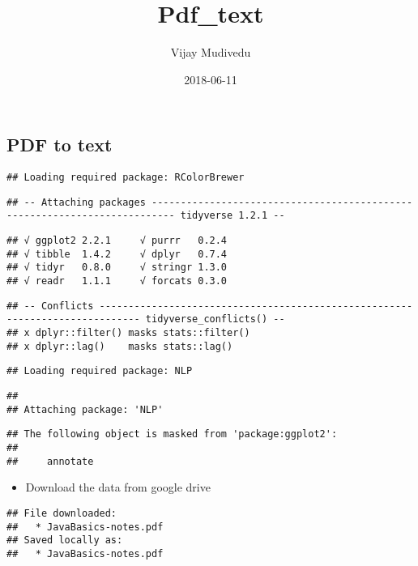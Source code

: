 \documentclass[]{article}
\title{Pdf\_text}
\author{Vijay Mudivedu}
\date{2018-06-11}
\providecommand{\tightlist}{%
  \setlength{\itemsep}{0pt}\setlength{\parskip}{0pt}}
\begin{document}
\maketitle

\subsection{PDF to text}\label{pdf-to-text}

\begin{verbatim}
## Loading required package: RColorBrewer
\end{verbatim}

\begin{verbatim}
## -- Attaching packages -------------------------------------------------------------------------- tidyverse 1.2.1 --
\end{verbatim}

\begin{verbatim}
## √ ggplot2 2.2.1     √ purrr   0.2.4
## √ tibble  1.4.2     √ dplyr   0.7.4
## √ tidyr   0.8.0     √ stringr 1.3.0
## √ readr   1.1.1     √ forcats 0.3.0
\end{verbatim}

\begin{verbatim}
## -- Conflicts ----------------------------------------------------------------------------- tidyverse_conflicts() --
## x dplyr::filter() masks stats::filter()
## x dplyr::lag()    masks stats::lag()
\end{verbatim}

\begin{verbatim}
## Loading required package: NLP
\end{verbatim}

\begin{verbatim}
## 
## Attaching package: 'NLP'
\end{verbatim}

\begin{verbatim}
## The following object is masked from 'package:ggplot2':
## 
##     annotate
\end{verbatim}

\begin{itemize}
\tightlist
\item
  Download the data from google drive
\end{itemize}

\begin{verbatim}
## File downloaded:
##   * JavaBasics-notes.pdf
## Saved locally as:
##   * JavaBasics-notes.pdf
\end{verbatim}
\end{document}
